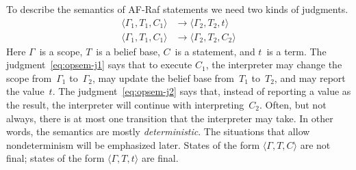 \documentclass[a4paper,12pt,oneside,fleqn]{book} %
\begin{document}
To describe the semantics of AF-Raf statements we need two kinds of
judgments.
\begin{align}
\langle \Gamma_1, T_1, C_1 \rangle &\to \langle\Gamma_2,T_2, t\rangle
  \label{eq:opsem-j1} \\
\langle \Gamma_1, T_1, C_1 \rangle &\to \langle \Gamma_2, T_2, C_2 \rangle
  \label{eq:opsem-j2}
\end{align}
Here $\Gamma$~is a scope, $T$~is a belief base, $C$~is a statement, and
$t$~is a term.  The judgment~\eqref{eq:opsem-j1} says that to execute
$C_1$, the interpreter may change the scope from~$\Gamma_1$ to~$\Gamma_2$,
may update the belief base from~$T_1$ to~$T_2$, and may report the
value~$t$.  The judgment~\eqref{eq:opsem-j2} says that, instead of
reporting a value as the result, the interpreter will continue with
interpreting~$C_2$.  Often, but not always, there is at most one transition
that the interpreter may take. In other words, the semantics are mostly
\emph{deterministic}. The situations that allow nondeterminism will be
emphasized later. States of the form $\langle\Gamma,T,C\rangle$ are not
final; states of the form $\langle\Gamma,T,t\rangle$ are final.
\end{document}

